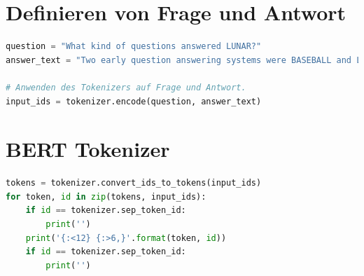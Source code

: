 \documentclass[
        ngerman,
        paper=a4,
        numbers=noendperiod,
]{scrreprt}
\begin{document}
\section{Definieren von Frage und Antwort}
\label{section:FRA} %
\begin{lstlisting}[language=Python]
question = "What kind of questions answered LUNAR?"
answer_text = "Two early question answering systems were BASEBALL and LUNAR. BASEBALL answered questions about the US baseball league over a period of one year. LUNAR, in turn, answered questions about the geological analysis of rocks returned by the Apollo moon missions. Both question answering systems were very effective in their chosen domains."

# Anwenden des Tokenizers auf Frage und Antwort.
input_ids = tokenizer.encode(question, answer_text)
\end{lstlisting}


\section{BERT Tokenizer}
\label{section:BERTTOK} %
\begin{lstlisting}[language=Python]
tokens = tokenizer.convert_ids_to_tokens(input_ids)
for token, id in zip(tokens, input_ids):
    if id == tokenizer.sep_token_id:
        print('')
    print('{:<12} {:>6,}'.format(token, id))
    if id == tokenizer.sep_token_id:
        print('')
\end{lstlisting}
\end{document}
